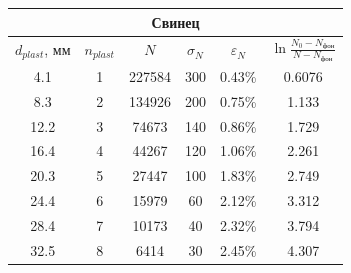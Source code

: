 \documentclass[a4paper,12pt]{extarticle}
\begin{document}
\begin{table}[h]
\begin{center}
\begin{tabular}{|c|c|c|c|c|c|}
\hline
\multicolumn{6}{|c|}{Свинец}\\ \hline
$d_{plast}$, мм & $n_{plast}$ & $N$& $\sigma_N$& $\varepsilon_N$& $\ln{\frac{N_0-N_{\text{фон}}}{N- N_{\text{фон}}}}$\\ \hline
4.1& 1           & 227584& 300& 0.43\%& 0.6076\\ \hline
8.3& 2           & 134926& 200        & 0.75\%& 1.133\\ \hline
12.2& 3           & 74673& 140        & 0.86\%& 1.729\\ \hline
16.4& 4           & 44267& 120& 1.06\%& 2.261\\ \hline
20.3& 5           & 27447& 100        & 1.83\%& 2.749\\ \hline
 24.4& 6& 15979& 60& 2.12\%& 3.312\\\hline
 28.4& 7& 10173& 40& 2.32\%& 3.794\\\hline
 32.5& 8& 6414& 30& 2.45\%& 4.307\\\hline
\end{tabular}
\end{center}
\end{table}
\end{document}
